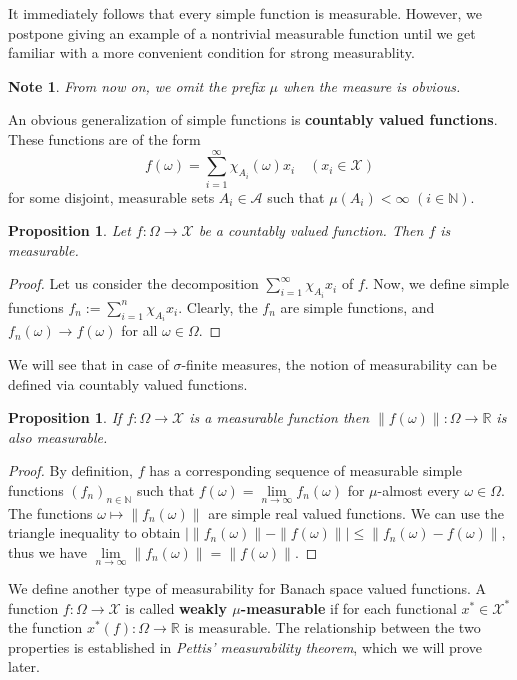 \documentclass[a4paper, 12pt]{article}
\newtheorem{state}[lem]{Proposition}
\newtheorem{note}[lem]{Note}
\begin{document}
It immediately follows that every simple function is measurable. However, we postpone giving an example of a nontrivial measurable function until we get familiar with a more convenient condition for strong measurablity.
\begin{note}\normalfont From now on, we omit the prefix $\mu$ when the measure is obvious.
\end{note}
An obvious generalization of simple functions is \textbf{countably valued functions}. These functions are of the form
$$f(\omega) = \sum^{\infty}_{i =1}\chi_{A_i}(\omega)x_i \quad (x_i \in \mathcal{X})$$ 
for some disjoint, measurable sets $A_i  \in \mathcal{A}$ such that $\mu(A_i) < \infty$ $(i \in \mathbb{N})$.
\begin{state}\label{all:countable-valued-is-measurable}
Let $f \colon \Omega \rightarrow \mathcal{X}$ be a countably valued function. Then $f$ is measurable.
\end{state}
\begin{proof}
Let us consider the decomposition $\sum^{\infty}_{i =1}\chi_{A_i}x_i$ of $f$. Now, we define simple functions $f_n := \sum^{n}_{i=1} \chi_{A_i} x_i$.
Clearly, the $f_n$ are simple functions, and $f_n(\omega) \rightarrow f(\omega)$ for all $\omega \in \Omega$.
\end{proof}
We will see that in case of $\sigma$-finite measures, the notion of measurability can be defined via countably valued functions.
\begin{state}\label{all:normas-fuggveny-mertheto} If $f \colon \Omega \rightarrow \mathcal{X}$ is a measurable function then $\| f(\omega) \| \colon \Omega \rightarrow \mathbb{R}$ is also measurable.
\end{state}
\begin{proof}
By definition, $f$ has a corresponding sequence of measurable simple functions $(f_n)_{n \in \mathbb{N}}$ such that $f(\omega) = \lim\limits_{n \to \infty} f_n(\omega)$ for $\mu$-almost every $\omega \in \Omega$. The functions $\omega \mapsto \| f_n(\omega) \|$ are simple real valued functions. We can use the triangle inequality to obtain $| \| f_n(\omega) \| - \| f(\omega) \| | \leqslant \| f_n(\omega) - f(\omega) \|$, thus we have $\lim\limits_{n \to \infty} \| f_n(\omega) \| = \| f(\omega) \|$.
\end{proof}
We define another type of measurability for Banach space valued functions. A function $f \colon \Omega \rightarrow \mathcal{X}$ is called \textbf{weakly $\mu$-measurable} if for each functional $x^* \in \mathcal{X}^*$ the function $x^*(f) \colon \Omega \rightarrow \mathbb{R}$ is measurable. The relationship between the two properties is established in \textit{Pettis' measurability theorem}, which we will prove later.
\end{document}
